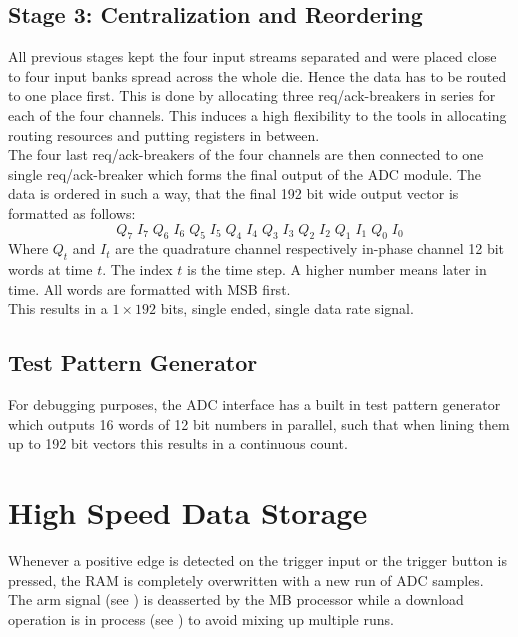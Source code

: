 \subsection{Stage 3: Centralization and Reordering}
\label{sec:fpga_adc_s3}
All previous stages kept the four input streams separated
and were placed close to four input banks spread across the whole die.
Hence the data has to be routed to one place first.
This is done by allocating three \gls{req}/\gls{ack}-breakers
in series for each of the four channels.
This induces a high flexibility to the tools in allocating routing
resources and putting registers in between. \\

The four last \gls{req}/\gls{ack}-breakers of the four channels are then connected
to one single \gls{req}/\gls{ack}-breaker which forms the final output of the
\gls{ADC} module. The data is ordered in such a way, that the final 192 bit
wide output vector is formatted as follows:
\[Q_7\;I_7\;Q_6\;I_6\;Q_5\;I_5\;Q_4\;I_4\;Q_3\;I_3\;Q_2\;I_2\;Q_1\;I_1\;Q_0\;I_0\]
Where $Q_t$ and $I_t$ are the quadrature channel respectively in-phase channel
12 bit words at time $t$.
The index $t$ is the time step. A higher number means later in time.
All words are formatted with \gls{MSB} first. \\

This results in a $1 \times 192$ bits, single ended, single data rate signal. \\

\subsection{Test Pattern Generator}
For debugging purposes, the \gls{ADC} interface has a built in test pattern
generator which outputs 16 words of 12 bit numbers in parallel, such that
when lining them up to 192 bit vectors this results in a continuous count.

\section{High Speed Data Storage}
\label{sec:fpga_storage}

Whenever a positive edge is detected on the trigger input or the trigger
button is pressed, the \gls{RAM} is completely overwritten with a new run of
\gls{ADC} samples. \\

The arm signal (see ) is deasserted
by the \gls{MB} processor while a download operation is in process
(see ) to avoid mixing up multiple runs. \\

